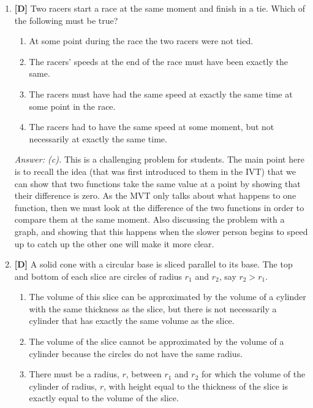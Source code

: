 \documentclass[12pt]{article}
\begin{document}
\begin{enumerate}
{\it Answer: True.} It might be a bit hard for students to
think of the model, but this problem is a good preparation for the
much harder problem that follows. Note that the IVT could have
also been used, by arguing that the velocity was during one part
of the race positive and then it became negative. 

\bigskip

\item {\bf [D]} 
Two racers start a race at the same moment and finish in a tie.
Which of the following must be true?

\begin{enumerate}
\item At some point during the race the two racers were not tied.
\item The racers' speeds at the end of the race must have been exactly
the same.
\item The racers must have had the same speed at exactly the same
time at some point in the race.
\item The racers had to have the same speed at some moment, but not
necessarily at exactly the same time.
\end{enumerate}

{\it Answer: (c).} This is a challenging problem for students.
The main point here is to recall the idea (that was first
introduced to them in the IVT) that we can show that two functions
take the same value at a point by showing that their difference is
zero. As the MVT only talks about what happens to one function,
then we must look at the difference of the two functions in order
to compare them at the same moment. Also discussing the problem
with a graph, and showing that this happens when the slower person
begins to speed up to catch up the other one will make it more
clear. 

\bigskip

\item {\bf [D]} A solid cone with a circular base is sliced parallel to its
base.  The top and bottom of each slice are circles of radius
$r_1$ and $r_2$, say $r_2 > r_1$.

\begin{enumerate}  
\item The volume of this slice can be approximated by
the volume of a cylinder with the same thickness as the slice, but
there is not necessarily a cylinder that has exactly the same
volume as the slice. 
\item The volume of the slice cannot be
approximated by the volume of a cylinder because the circles do
not have the same radius.  
\item There must be a radius, $r$,
between $r_1$ and $r_2$  for which the volume of the cylinder of
radius, $r$, with height equal to the thickness of the slice is
exactly equal to the volume of the slice.
\end{enumerate}


\end{enumerate}
\end{document}
